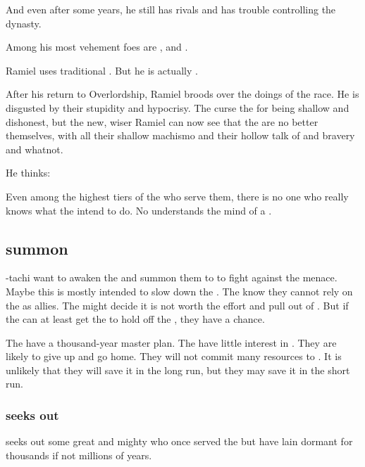 And even after some years, he still has rivals and has trouble controlling the dynasty. 

Among his most vehement foes are , \Sargamel and \Themirod. 

Ramiel uses traditional \Mystraacht {}. 
But he is actually . 

After his return to Overlordship, Ramiel broods over the doings of the \resphan race.
He is disgusted by their stupidity and hypocrisy. 
The \Mystraacht curse the \CiriathSepher for being shallow and dishonest, but the new, wiser Ramiel can now see that the \Mystraacht are no better themselves, with all their shallow machismo and their hollow talk of \honour and bravery and whatnot.

He thinks: 

Even among the highest tiers of the \resphain who serve them, there is no one who really knows what the \banelords intend to do.
No \resphan understands the mind of a \bane.









\subsection{\Dragons summon \xss}
\Secherdamon-tachi want to awaken the \xss and summon them to \Miith to fight against the \bane menace. 
Maybe this is mostly intended to slow down the \banes. 
The \dragons know they cannot rely on the \xss as allies.
The \xss might decide it is not worth the effort and pull out of \Miith.
But if the \dragons can at least get the \xss to hold off the \banes, they have a chance. 

The \banes have a thousand-year master plan.
The \xss have little interest in \Miith.
They are likely to give up and go home. 
They will not commit many resources to \Miith. 
It is unlikely that they will save it in the long run, but they may save it in the short run. 





\subsubsection{\Vizsherioch seeks out \daemons}
\Vizsherioch{} seeks out some great and mighty \daemons{} who once served the \xzaishanns{} but have lain dormant for thousands if not millions of years. 

